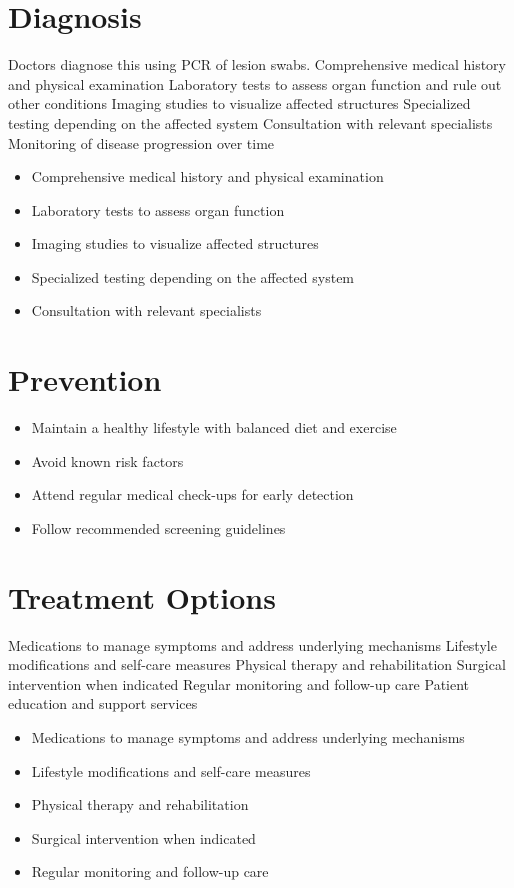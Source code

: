 \section{Diagnosis}
Doctors diagnose this using PCR of lesion swabs. Comprehensive medical history and physical examination Laboratory tests to assess organ function and rule out other conditions Imaging studies to visualize affected structures Specialized testing depending on the affected system Consultation with relevant specialists Monitoring of disease progression over time

\begin{itemize}[noitemsep]
  \item Comprehensive medical history and physical examination
  \item Laboratory tests to assess organ function
  \item Imaging studies to visualize affected structures
  \item Specialized testing depending on the affected system
  \item Consultation with relevant specialists
\end{itemize}
\section{Prevention}
\begin{itemize}[noitemsep]
  \item Maintain a healthy lifestyle with balanced diet and exercise
  \item Avoid known risk factors
  \item Attend regular medical check-ups for early detection
  \item Follow recommended screening guidelines
\end{itemize}
\section{Treatment Options}
Medications to manage symptoms and address underlying mechanisms Lifestyle modifications and self-care measures Physical therapy and rehabilitation Surgical intervention when indicated Regular monitoring and follow-up care Patient education and support services

\begin{itemize}[noitemsep]
  \item Medications to manage symptoms and address underlying mechanisms
  \item Lifestyle modifications and self-care measures
  \item Physical therapy and rehabilitation
  \item Surgical intervention when indicated
  \item Regular monitoring and follow-up care
\end{itemize}
